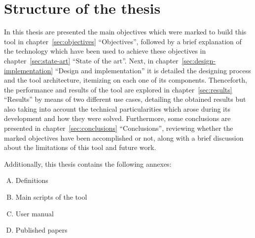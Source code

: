 \documentclass[a4paper, 12pt]{book}
\begin{document}
\section{Structure of the thesis}
\label{sec:structure}
In this thesis are presented the main objectives which were marked to build this tool in chapter~\ref{sec:objectives} ``Objectives'',
followed by a brief explanation of the technology which have been used to achieve these objectives in chapter~\ref{sec:state-art} ``State of the art''.
Next, in chapter~\ref{sec:design-implementation} ``Design and implementation'' it is detailed the designing process and the tool architecture, itemizing on each one of its components.
Thenceforth, the performance and results of the tool are explored in chapter~\ref{sec:results} ``Results'' by means of two different use cases,
detailing the obtained results but also taking into account the technical particularities which arose during its development and how they were solved.
Furthermore, some conclusions are presented in chapter~\ref{sec:conclusions} ``Conclusions'', reviewing whether the marked objectives have been accomplished or not,
along with a brief discussion about the limitations of this tool and future work.\par
Additionally, this thesis contains the following annexes:
\begin{enumerate}[A.]
  \item Definitions
  \item Main scripts of the tool
  \item User manual
  \item Published papers
\end{enumerate}
\cleardoublepage
\end{document}
